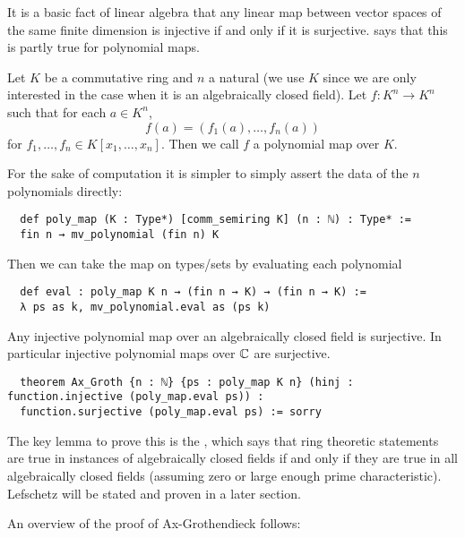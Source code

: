 It is a basic fact of linear algebra that any linear map
between vector spaces of the same finite dimension is
injective if and only if it is surjective.
 says that this is
partly true for polynomial maps.

\begin{dfn}
  Let $K$ be a commutative ring and $n$ a natural
  (we use $K$ since we are only interested in the case
  when it is an algebraically closed field).
  Let $f : K^n \to K^n$ such that for each $a \in K^n$,
  \[f(a) = (f_1(a), \dots, f_n(a))\] for
  $f_1, \dots, f_n \in K[x_1, \dots, x_n]$.
  Then we call $f$ a polynomial map over $K$.

  For the sake of computation it is simpler to simply assert
  the data of the $n$ polynomials directly:

  \begin{lstlisting}
  def poly_map (K : Type*) [comm_semiring K] (n : ℕ) : Type* :=
  fin n → mv_polynomial (fin n) K \end{lstlisting}

  Then we can take the map on types/sets by evaluating each polynomial
  \begin{lstlisting}
  def eval : poly_map K n → (fin n → K) → (fin n → K) :=
  λ ps as k, mv_polynomial.eval as (ps k) \end{lstlisting}
\end{dfn}

\begin{prop}[Ax-Grothendieck]
    Any injective polynomial map over an algebraically closed field is surjective.
    In particular injective polynomial maps over $\mathbb{C}$ are surjective.

\begin{lstlisting}
  theorem Ax_Groth {n : ℕ} {ps : poly_map K n} (hinj : function.injective (poly_map.eval ps)) :
  function.surjective (poly_map.eval ps) := sorry \end{lstlisting}
\end{prop}

The key lemma to prove this is the ,
which says that ring theoretic statements are true in instances of algebraically closed fields
if and only if they are true in all algebraically closed fields
(assuming zero or large enough prime characteristic).
Lefschetz will be stated and proven in a later section.

An overview of the proof of Ax-Grothendieck follows:

